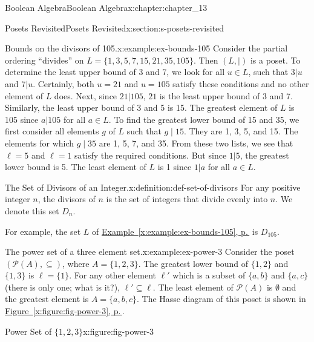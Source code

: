 \documentclass[twoside,10pt,]{book}
\newcommand{\xreffont}{\relax}
\numberwithin{equation}{section}
\begin{document}
\begin{chapterptx}{Boolean Algebra}{}{Boolean Algebra}{}{}{x:chapter:chapter_13}
\begin{sectionptx}{Posets Revisited}{}{Posets Revisited}{}{}{x:section:s-posets-revisited}
\begin{example}{Bounds on the divisors of 105.}{x:example:ex-bounds-105}
Consider the partial ordering ``divides'' on \(L = \{1, 3, 5, 7, 15, 21, 35, 105\}\). Then \((L, \mid)\) is a poset. To determine the least upper bound of 3 and 7, we look for all \(u  \in  L\), such that \(3|u\) and \(7|u\). Certainly, both \(u  = 21\) and \(u  = 105\) satisfy these conditions and no other element of \(L\) does. Next, since \(21|105\),  \(21\) is the least upper bound of 3 and 7. Similarly, the  least upper bound of 3 and 5 is 15. The greatest element of \(L\) is 105 since \(a|105\) for all \(a \in  L\). To find the greatest lower bound of 15 and 35, we first consider all elements \(g\) of \(L\) such that \(g \mid 15\).  They are 1, 3, 5, and 15.  The elements for which  \(g \mid 35\) are 1, 5, 7, and 35. From these two lists, we see that \(\ell = 5\) and \(\ell = 1\) satisfy the required conditions. But since \(1|5\),  the greatest lower bound is 5. The least element of \(L\) is 1 since \(1|a\) for all \(a \in  L\).%
\end{example}
\begin{definition}{The Set of Divisors of an Integer.}{x:definition:def-set-of-divisors}%
%
\label{g:notation:idm404593155056}%
For any positive integer \(n\), the divisors of \(n\) is the set of integers that divide evenly into \(n\).  We denote this set \(D_n\).%
\end{definition}
For example, the set \(L\) of \hyperref[x:example:ex-bounds-105]{Example~{\xreffont\ref{x:example:ex-bounds-105}}, p.\,\pageref{x:example:ex-bounds-105}} is \(D_{105}\).%
\begin{example}{The power set of a three element set.}{x:example:ex-power-3}%
Consider the poset \((\mathcal{P}(A),\subseteq)\), where \(A = \{1, 2, 3\}\).  The greatest lower bound of  \(\{1, 2\}\) and \(\{1,3\}\) is \(\ell = \{1\}\). For any other element \(\ell'\)  which is a subset of \(\{a,
b\}\) and \(\{a, c\}\) (there is only one; what is it?), \(\ell' \subseteq  \ell\). The least element of \(\mathcal{P}(A)\) is \(\emptyset\)  and the greatest element  is \(A=\{a, b, c\}\). The Hasse diagram of this poset is shown in \hyperref[x:figure:fig-power-3]{Figure~{\xreffont\ref{x:figure:fig-power-3}}, p.\,\pageref{x:figure:fig-power-3}}.%
\begin{figureptx}{Power Set of \(\{1, 2, 3\}\)}{x:figure:fig-power-3}{}%
\begin{image}{0.3}{0.4}{0.3}%

\end{image}
\end{figureptx}
\end{example}
\end{sectionptx}
\end{chapterptx}
\end{document}
